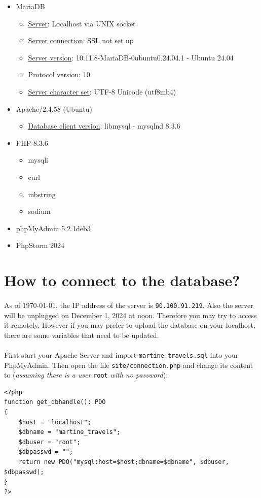 \documentclass[11pt,a4paper,titlepage]{article}
\begin{document}
\begin{itemize}
	\item MariaDB 
	\begin{itemize}
		\item \underline{Server}: Localhost via UNIX socket
		\item \underline{Server connection}: SSL not set up
		\item \underline{Server version}: 10.11.8-MariaDB-0ubuntu0.24.04.1 - Ubuntu 24.04
		\item \underline{Protocol version}: 10
		\item \underline{Server character set}: UTF-8 Unicode (utf8mb4)
	\end{itemize}
	\item Apache/2.4.58 (Ubuntu)
	\begin{itemize}
		\item \underline{Database client version}: libmysql - mysqlnd 8.3.6
	\end{itemize}
	\item PHP 8.3.6 
	\begin{itemize}
		\item mysqli
		\item curl
		\item mbstring
		\item sodium
	\end{itemize}
	\item phpMyAdmin 5.2.1deb3
	\item PhpStorm 2024
\end{itemize}

\section{How to connect to the database?} \label{DB_Connect}
\paragraph{}
As of \today, the IP address of the server is \verb|90.100.91.219|. Also the server will be unplugged on December 1, 2024 at noon. Therefore you may try to access it remotely. However if you may prefer to upload the database on your localhost, there are some variables that need to be updated.
\paragraph{}
First start your Apache Server and import \verb|martine_travels.sql| into your PhpMyAdmin. Then open the file \verb|site/connection.php| and change its content to (\textit{assuming there is a user } \verb|root| \textit{with no password}):

\begin{verbatim}
<?php
function get_dbhandle(): PDO
{
	$host = "localhost";
	$dbname = "martine_travels";
	$dbuser = "root";
	$dbpasswd = "";
	return new PDO("mysql:host=$host;dbname=$dbname", $dbuser, $dbpasswd);
}
?>
\end{verbatim}
\end{document}
